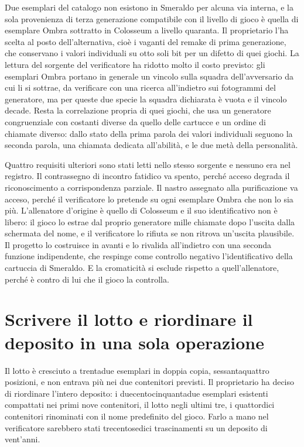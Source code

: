 Due esemplari del catalogo non esistono in Smeraldo per alcuna via interna, e la sola provenienza di terza generazione compatibile con il livello di gioco è quella di esemplare Ombra sottratto in Colosseum a livello quaranta. Il proprietario l'ha scelta al posto dell'alternativa, cioè i vaganti del remake di prima generazione, che conservano i valori individuali su otto soli bit per un difetto di quei giochi. La lettura del sorgente del verificatore ha ridotto molto il costo previsto: gli esemplari Ombra portano in generale un vincolo sulla squadra dell'avversario da cui li si sottrae, da verificare con una ricerca all'indietro sui fotogrammi del generatore, ma per queste due specie la squadra dichiarata è vuota e il vincolo decade. Resta la correlazione propria di quei giochi, che usa un generatore congruenziale con costanti diverse da quello delle cartucce e un ordine di chiamate diverso: dallo stato della prima parola dei valori individuali seguono la seconda parola, una chiamata dedicata all'abilità, e le due metà della personalità.

Quattro requisiti ulteriori sono stati letti nello stesso sorgente e nessuno era nel registro. Il contrassegno di incontro fatidico va spento, perché acceso degrada il riconoscimento a corrispondenza parziale. Il nastro assegnato alla purificazione va acceso, perché il verificatore lo pretende su ogni esemplare Ombra che non lo sia più. L'allenatore d'origine è quello di Colosseum e il suo identificativo non è libero: il gioco lo estrae dal proprio generatore mille chiamate dopo l'uscita dalla schermata del nome, e il verificatore lo rifiuta se non ritrova un'uscita plausibile. Il progetto lo costruisce in avanti e lo rivalida all'indietro con una seconda funzione indipendente, che respinge come controllo negativo l'identificativo della cartuccia di Smeraldo. E la cromaticità si esclude rispetto a quell'allenatore, perché è contro di lui che il gioco la controlla.

\section{Scrivere il lotto e riordinare il deposito in una sola operazione}

Il lotto è cresciuto a trentadue esemplari in doppia copia, sessantaquattro posizioni, e non entrava più nei due contenitori previsti. Il proprietario ha deciso di riordinare l'intero deposito: i duecentocinquantadue esemplari esistenti compattati nei primi nove contenitori, il lotto negli ultimi tre, i quattordici contenitori rinominati con il nome predefinito del gioco. Farlo a mano nel verificatore sarebbero stati trecentosedici trascinamenti su un deposito di vent'anni.

